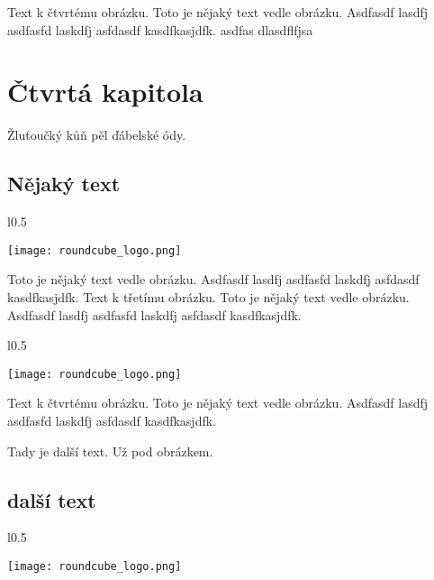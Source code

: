 \documentclass[12pt,a4paper,twoside]{book}
\begin{document}
Text k čtvrtému obrázku. Toto je nějaký text vedle obrázku. Asdfasdf lasdfj asdfasfd laskdfj asfdasdf kasdfkasjdfk.
\newline
asdfas dlasdflfjsa 
\chapter{Čtvrtá kapitola}
Žluťoučký kůň pěl ďábelské ódy.
\section{Nějaký text}

\begin{wrapfigure}{l}{0.5\textwidth}
  \vspace{-30pt}
  \begin{center}
    \texttt{[image: roundcube\_logo.png]}
  \end{center}
  \vspace{-10pt}
\end{wrapfigure}

Toto je nějaký text vedle obrázku. Asdfasdf lasdfj asdfasfd laskdfj asfdasdf kasdfkasjdfk.
\newline
Text k třetímu obrázku. Toto je nějaký text vedle obrázku. Asdfasdf lasdfj asdfasfd laskdfj asfdasdf kasdfkasjdfk.
\newline

\begin{wrapfigure}{l}{0.5\textwidth}
  \vspace{-20pt}
  \begin{center}
    \texttt{[image: roundcube\_logo.png]}
  \end{center}
  \vspace{-20pt}
\end{wrapfigure}

Text k čtvrtému obrázku. Toto je nějaký text vedle obrázku. Asdfasdf lasdfj asdfasfd laskdfj asfdasdf kasdfkasjdfk.
\newline


Tady je další text. Už pod obrázkem.

\section{další  text}

\begin{wrapfigure}{l}{0.5\textwidth}
  \vspace{-30pt}
  \begin{center}
    \texttt{[image: roundcube\_logo.png]}
  \end{center}
  \vspace{-10pt}
\end{wrapfigure}
\end{document}
